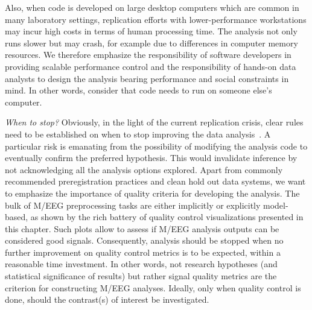 Also, when code is developed on large desktop computers which are common in many laboratory settings, replication efforts with lower-performance workstations may incur high costs in terms of human processing time. The analysis not only runs slower but may crash, for example due to differences in computer memory resources. We therefore emphasize the responsibility of software developers in providing scalable performance control and the responsibility of hands-on data analysts to design the analysis bearing performance and social constraints in mind. In other words, consider that code needs to run on someone else's computer.


\emph{When to stop?} Obviously, in the light of the current replication crisis, clear rules need to be established on when to stop improving the data analysis~\citep{simmons2011false,szucs2017}. A particular risk is emanating from the possibility of modifying the analysis code to eventually confirm the preferred hypothesis. This would invalidate inference by not acknowledging all the analysis options explored. Apart from commonly recommended preregistration practices and clean hold out data systems, we want to emphasize the importance of quality criteria for developing the analysis. The bulk of M/EEG preprocessing tasks are either implicitly or explicitly model-based, as shown by the rich battery of quality control visualizations presented in this chapter. Such plots allow to assess if M/EEG analysis outputs can be considered good signals. Consequently, analysis should be stopped when no further improvement on quality control metrics is to be expected, within a reasonable time investment. In other words, not research hypotheses (and statistical significance of results) but rather signal quality metrics are the criterion for constructing M/EEG analyses. Ideally, only when quality control is done, should the contrast(s) of interest be investigated.

